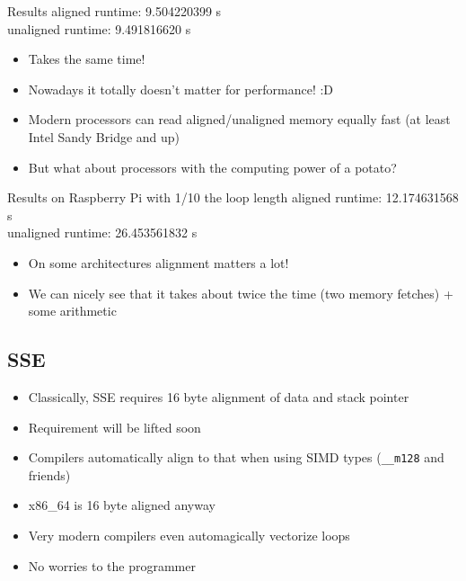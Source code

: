 \documentclass{beamer}
\begin{document}
\begin{frame}{\insertsection}{\insertsubsection}
    \begin{block}{Results}
        aligned runtime: 9.504220399 s\\
        unaligned runtime: 9.491816620 s
    \end{block}
    \pause
    \begin{itemize}
        \item Takes the same time!\pause
	    \item Nowadays it totally doesn't matter for performance! :D
        \item Modern processors can read aligned/unaligned memory equally fast (at least Intel
            Sandy Bridge and up)\pause
        \item But what about processors with the computing power of a potato?
	\end{itemize}
\end{frame}

\begin{frame}{\insertsection}{\insertsubsection}
    \begin{block}{Results on Raspberry Pi with 1/10 the loop length}
        aligned runtime: 12.174631568 s\\
        unaligned runtime: 26.453561832 s
    \end{block}
    \pause
    \begin{itemize}
        \item On some architectures alignment matters a lot!
        \item We can nicely see that it takes about twice the time (two memory fetches) + some
            arithmetic
	\end{itemize}
\end{frame}

\subsection{SSE}
\begin{frame}[fragile]{\insertsection}{\insertsubsection}
    \begin{itemize}
        \item Classically, SSE requires 16 byte alignment of data and stack pointer
        \item Requirement will be lifted soon\pause
        \item Compilers automatically align to that when using SIMD types (\verb|__m128| and
            friends)
        \item x86\_64 is 16 byte aligned anyway
        \item Very modern compilers even automagically vectorize loops
        \item No worries to the programmer {\large\smiley}
    \end{itemize}
\end{frame}
\end{document}
